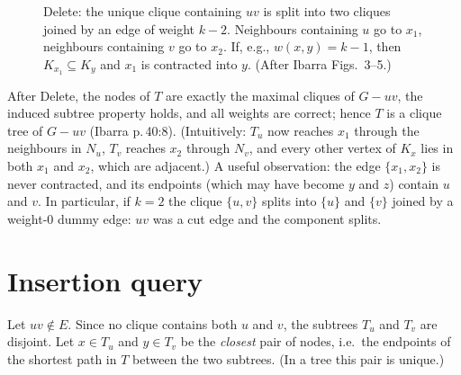 \documentclass[11pt,a4paper,oneside]{report}
\theoremstyle{plain}
\theoremstyle{definition}
\theoremstyle{remark}
\newcommand{\op}[1]{\textsf{#1}}
\begin{document}
\begin{figure}[ht]
\centering
{}
\caption[The deletion update]{\op{Delete}: the unique clique containing \(uv\) is split into two cliques joined by an
edge of weight \(k-2\). Neighbours containing \(u\) go to \(x_1\), neighbours containing \(v\)
go to \(x_2\). If, e.g., \(w(x,y)=k-1\), then \(K_{x_1}\subseteq K_y\) and \(x_1\) is contracted
into \(y\). (After Ibarra Figs.~3--5.)}
\label{fig:delete}
\end{figure}

After \op{Delete}, the nodes of \(T\) are exactly the maximal cliques of \(G-uv\), the induced
subtree property holds, and all weights are correct; hence \(T\) is a clique tree of \(G-uv\)
(Ibarra p.\,40:8). (Intuitively: \(T_u\) now reaches \(x_1\) through the neighbours in \(N_u\),
\(T_v\) reaches \(x_2\) through \(N_v\), and every other vertex of \(K_x\) lies in both \(x_1\)
and \(x_2\), which are adjacent.) A useful observation: the edge \(\{x_1,x_2\}\) is never
contracted, and its endpoints (which may have become \(y\) and \(z\)) contain \(u\) and \(v\).
In particular, if \(k=2\) the clique \(\{u,v\}\) splits into \(\{u\}\) and \(\{v\}\) joined by a
weight-0 dummy edge: \(uv\) was a cut edge and the component splits.

\section{Insertion query}\label{sec:insert-query-math}
Let \(uv\notin E\). Since no clique contains both \(u\) and \(v\), the subtrees \(T_u\) and
\(T_v\) are disjoint. Let \(x\in T_u\) and \(y\in T_v\) be the \emph{closest} pair of nodes,
i.e.\ the endpoints of the shortest path in \(T\) between the two subtrees. (In a tree this
pair is unique.)
\end{document}
